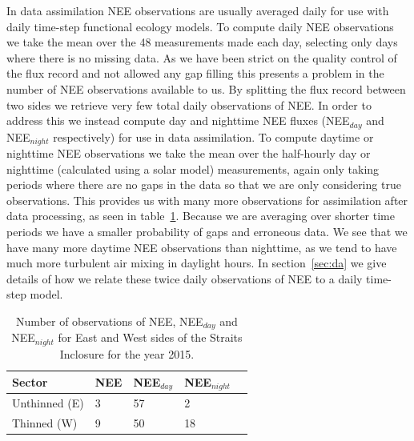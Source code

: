 \documentclass[11pt]{article}
\begin{document}
In data assimilation NEE observations are usually averaged daily for use with daily time-step functional ecology models. To compute daily NEE observations we take the mean over the 48 measurements made each day, selecting only days where there is no missing data. As we have been strict on the quality control of the flux record and not allowed any gap filling this presents a problem in the number of NEE observations available to us. By splitting the flux record between two sides we retrieve very few total daily observations of NEE. In order to address this we instead compute day and nighttime NEE fluxes (NEE\(_{day}\) and NEE\(_{night}\) respectively) for use in data assimilation. To compute daytime or nighttime NEE observations we take the mean over the half-hourly day or nighttime (calculated using a solar model) measurements, again only taking periods where there are no gaps in the data so that we are only considering true observations. This provides us with many more observations for assimilation after data processing, as seen in table~\ref{table:nee_obs}. Because we are averaging over shorter time periods we have a smaller probability of gaps and erroneous data. We see that we have many more daytime NEE observations than nighttime, as we tend to have much more turbulent air mixing in daylight hours. In section~\ref{sec:da} we give details of how we relate these twice daily observations of NEE to a daily time-step model.     

\begin{table}[ht] 
\begin{center}
	\begin{tabular}{| l | l | l | l | l |}
	\hline
	Sector & NEE & NEE\(_{day}\) & NEE\(_{night}\)  \\ \hline
	Unthinned (E) & 3 & 57 & 2 \\ \hline
	Thinned (W) & 9 & 50 & 18 \\ \hline
	\end{tabular}
	\caption{Number of observations of NEE, NEE\(_{day}\) and NEE\(_{night}\) for East and West sides of the Straits Inclosure for the year 2015.}
	\label{table:nee_obs}
\end{center} 
\end{table}
\end{document}
